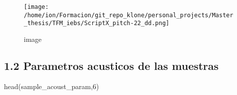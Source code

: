 \documentclass[
]{article}
\newenvironment{Shaded}{\begin{snugshade}}{\end{snugshade}}
\newcommand{\DecValTok}[1]{\textcolor[rgb]{0.00,0.00,0.81}{#1}}
\newcommand{\FunctionTok}[1]{\textcolor[rgb]{0.00,0.00,0.00}{#1}}
\newcommand{\NormalTok}[1]{#1}
\begin{document}
\vspace{15pt}

\begin{figure}
\centering
\texttt{[image: /home/ion/Formacion/git\_repo\_klone/personal\_projects/Master\_thesis/TFM\_iebs/ScriptX\_pitch-22\_dd.png]}
\caption{image}
\end{figure}

\newpage

\hypertarget{parametros-acusticos-de-las-muestras}{%
\subsection{1.2 Parametros acusticos de las
muestras}\label{parametros-acusticos-de-las-muestras}}

\begin{Shaded}
\begin{Highlighting}[]
\FunctionTok{head}\NormalTok{(sample\_acoust\_param,}\DecValTok{6}\NormalTok{)}
\end{Highlighting}
\end{Shaded}
\end{document}
